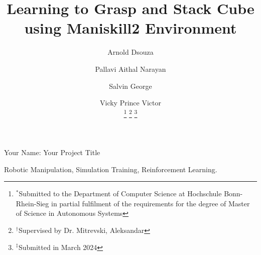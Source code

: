 \documentclass[lettersize,journal]{IEEEtran}
\begin{document}
\title{Learning to Grasp and Stack Cube using Maniskill2 Environment}

\author{
        Arnold Dsouza\\
        \and
        Pallavi Aithal Narayan\\
        \and
        Salvin George\\
        \and
        Vicky Prince Victor\\
\thanks{$^*$Submitted to the Department of Computer Science at Hochschule Bonn-Rhein-Sieg in partial fulfilment of the requirements for the degree of Master of Science in Autonomous Systems}
\thanks{$^{\dagger}$Supervised by Dr. Mitrevski, Aleksandar}
\thanks{$^{\ddagger}$Submitted in March 2024}} %

%
{Your Name: Your Project Title}

\maketitle



\begin{IEEEkeywords}
Robotic Manipulation, Simulation Training, Reinforcement Learning.
\end{IEEEkeywords}










\end{document}
